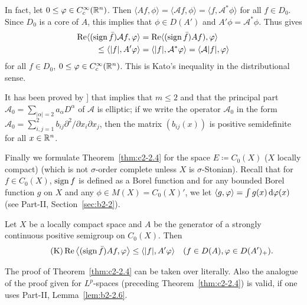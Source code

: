 In fact, let $0 \leq \phi \in C_{c}^{\infty}(\R^n)$.
Then $\langle Af,\phi \rangle = \langle \mathcal{A}f,\phi \rangle = \langle f,\mathcal{A}^{*}\phi \rangle$ for all $f \in D_{0}$.
Since $D_{0}$ is a core of\/ $A$, this implies that $\phi \in D(A')$ and $A'\phi = \mathcal{A}^{*}\phi$.
Thus   gives 
%
\begin{align*}
\Re\langle(\sign \bar{f})\mathcal{A}f,\phi \rangle &= \Re\langle(\sign \bar{f})Af),\phi \rangle \\
 \leq \langle |f|,A'\phi \rangle & = \langle |f|,\mathcal{A}^{*}\phi \rangle = \langle \mathcal{A}|f|,\phi \rangle
\end{align*}
%
for all $f \in D_{0}$, $0 \leq \phi \in C_{c}^{\infty}(\R^n)$.
This is Kato's inequality in the distributional sense.
\begin{remark*}\label{rem:c2-3.0}
It has been proved by \textcite{miyajimaokazawa:1984}] that  implies that $m \leq 2$ and that the principal part $\mathcal{A}_{0} = \sum_{|\alpha|=2} a_{\alpha} D^{\alpha}$ of\/ $\mathcal{A}$ is elliptic; \ie if we write the operator $\mathcal{A}_{0}$ in the form $\mathcal{A}_{0} = \sum_{i,j=1}^{2} b_{ij} \partial^{2}/\partial x_{i} \partial x_{j}$, then the matrix $(b_{ij}(x))$ is positive semidefinite for all $x \in \mathbb{R}^n$.
\end{remark*}
Finally we formulate Theorem~\ref{thm:c2-2.4}   for the space $E \coloneq C_{0}(X)$ ($X$ locally compact) (which is not $\sigma$-order complete unless $X$ is $\sigma$-Stonian).
Recall that for $f \in C_{0}(X)$, \mbox{$\operatorname{sign} f$} is defined as a Borel function and for any bounded Borel function $g$ on $X$ and any $\phi \in M(X) = C_{0}(X)'$, we let $\langle g,\phi \rangle = \int g(x) \diff{\phi}(x)$ (see Part-II, Section~\ref{sec:b2-2}).
\begin{theorem}\label{thm:c2-2.6}
%
Let $X$ be a locally compact space and $A$ be the generator of a strongly continuous positive semigroup on 
$C_{0}(X)$.
Then
\begin{equation*}\label{eq:c2-K-3} \tag{K}
\Re\left\langle(\sign \bar{f})Af,\phi \right\rangle \leq \langle |f|,A'\phi \rangle \quad (f \in D(A), \phi \in D(A')_{+}).
\end{equation*}
\end{theorem}
The proof of Theorem~\ref{thm:c2-2.4} can be taken over literally.
Also the analogue of the proof given for $L^p$-spaces (preceding Theorem~\ref{thm:c2-2.4})  is valid, if one uses Part-II, Lemma~\ref{lem:b2-2.6}.

